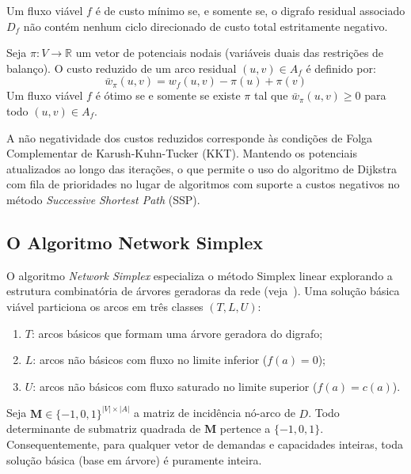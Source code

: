 \begin{prop}\label{prop:klein_rel}
Um fluxo viável $f$ é de custo mínimo se, e somente se, o digrafo residual associado $D_f$ não contém nenhum ciclo direcionado de custo total estritamente negativo.
\end{prop}

\begin{prop}\label{prop:potenciais_rel}
Seja $\pi: V \to \mathbb{R}$ um vetor de potenciais nodais (variáveis duais das restrições de balanço). O custo reduzido de um arco residual $(u, v) \in A_f$ é definido por:
\begin{equation}
    \bar{w}_\pi(u, v) = w_f(u, v) - \pi(u) + \pi(v)
\end{equation}
Um fluxo viável $f$ é ótimo se e somente se existe $\pi$ tal que $\bar{w}_\pi(u, v) \ge 0$ para todo $(u, v) \in A_f$.
\end{prop}

A não negatividade dos custos reduzidos corresponde às condições de Folga Complementar de Karush-Kuhn-Tucker (KKT). Mantendo os potenciais atualizados ao longo das iterações, o que permite o uso do algoritmo de Dijkstra com fila de prioridades no lugar de algoritmos com suporte a custos negativos no método \textit{Successive Shortest Path} (SSP).

\subsection{O Algoritmo Network Simplex}

O algoritmo \textit{Network Simplex} especializa o método Simplex linear explorando a estrutura combinatória de árvores geradoras da rede (veja~\cite{ahuja1993network, dantzig1951application}). Uma solução básica viável particiona os arcos em três classes $(T, L, U)$:
\begin{enumerate}
    \item $T$: arcos básicos que formam uma árvore geradora do digrafo;
    \item $L$: arcos não básicos com fluxo no limite inferior ($f(a) = 0$);
    \item $U$: arcos não básicos com fluxo saturado no limite superior ($f(a) = c(a)$).
\end{enumerate}

\begin{prop}\label{prop:tum_rel}
Seja $\mathbf{M} \in \{-1, 0, 1\}^{|V| \times |A|}$ a matriz de incidência nó-arco de $D$. Todo determinante de submatriz quadrada de $\mathbf{M}$ pertence a $\{-1, 0, 1\}$. Consequentemente, para qualquer vetor de demandas e capacidades inteiras, toda solução básica (base em árvore) é puramente inteira.
\end{prop}

